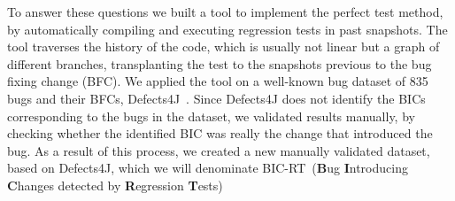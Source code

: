 \newcommand{\datasetName}[0]{BIC-RT}
To answer these questions we built a tool to implement the perfect test method, by automatically compiling and executing regression tests in past snapshots. The tool traverses the history of the code, which is usually not linear but a graph of different branches, transplanting the test to the snapshots previous to the bug fixing change (BFC). We applied the tool  on a well-known bug dataset of 835 bugs and their BFCs, Defects4J~\cite{just2014defects4j}. 
Since Defects4J does not identify the BICs corresponding to the bugs in the dataset, we validated results manually, by checking whether the identified BIC was really the change that introduced the bug.
As a result of this process, we created a new manually validated dataset, based on Defects4J, which we will denominate \datasetName~(\textbf{B}ug \textbf{I}ntroducing \textbf{C}hanges detected by \textbf{R}egression \textbf{T}ests)


